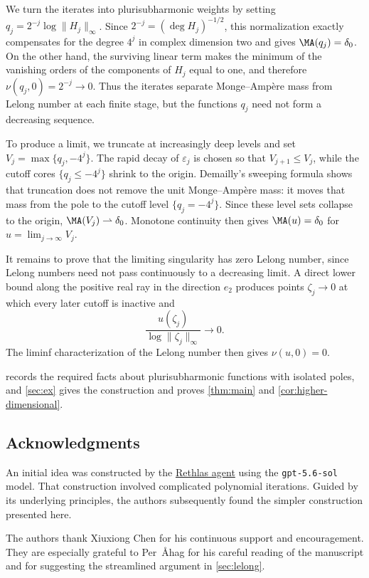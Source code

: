 \documentclass[11pt,a4paper]{article}
\begin{document}
We turn the iterates into plurisubharmonic weights by setting $q_j=2^{-j}\log\|H_j\|_\infty$. Since $2^{-j}=(\deg H_j)^{-1/2}$, this normalization exactly compensates for the degree $4^j$ in complex dimension two and gives $\MA(q_j)=\delta_0$. On the other hand, the surviving linear term makes the minimum of the vanishing orders of the components of $H_j$ equal to one, and therefore $\nu(q_j,0)=2^{-j}\to0$. Thus the iterates separate Monge--Amp\`ere mass from Lelong number at each finite stage, but the functions $q_j$ need not form a decreasing sequence.

To produce a limit, we truncate at increasingly deep levels and set $V_j=\max\{q_j,-4^j\}$. The rapid decay of $\varepsilon_j$ is chosen so that $V_{j+1}\le V_j$, while the cutoff cores $\{q_j\le-4^j\}$ shrink to the origin. Demailly's sweeping formula shows that truncation does not remove the unit Monge--Amp\`ere mass: it moves that mass from the pole to the cutoff level $\{q_j=-4^j\}$. Since these level sets collapse to the origin, $\MA(V_j)\rightharpoonup\delta_0$. Monotone continuity then gives $\MA(u)=\delta_0$ for $u=\lim_{j\to\infty}V_j$.

It remains to prove that the limiting singularity has zero Lelong number, since Lelong numbers need not pass continuously to a decreasing limit. A direct lower bound along the positive real ray in the direction $e_2$ produces points $\zeta_j\to0$ at which every later cutoff is inactive and
\[
  \frac{u(\zeta_j)}{\log\|\zeta_j\|_\infty}\longrightarrow0.
\]
The liminf characterization of the Lelong number then gives $\nu(u,0)=0$.

 records the required facts about plurisubharmonic functions with isolated poles, and \cref{sec:ex} gives the construction and proves \cref{thm:main} and \cref{cor:higher-dimensional}.

\subsection*{Acknowledgments}

An initial idea was constructed by the \href{https://github.com/frenzymath/Rethlas}{Rethlas agent} using the \texttt{gpt-5.6-sol} model. That construction involved complicated polynomial iterations. Guided by its underlying principles, the authors subsequently found the simpler construction presented here.

The authors thank Xiuxiong Chen for his continuous support and encouragement. They are especially grateful to Per~{\AA}hag for his careful reading of the manuscript and for suggesting the streamlined argument in \cref{sec:lelong}.
\end{document}
